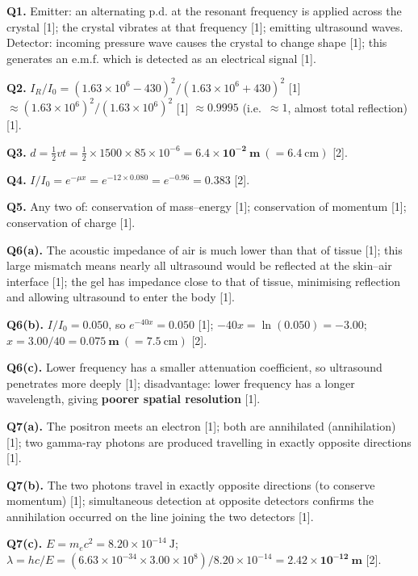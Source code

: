 \begin{markscheme}

\textbf{Q1.} Emitter: an alternating p.d. at the resonant frequency is applied across the crystal [1]; the crystal vibrates at that frequency [1]; emitting ultrasound waves. Detector: incoming pressure wave causes the crystal to change shape [1]; this generates an e.m.f. which is detected as an electrical signal [1].

\vspace{0.5em}\textbf{Q2.} $I_R/I_0 = (1.63\times10^6 - 430)^2/(1.63\times10^6 + 430)^2$ [1] $\approx (1.63\times10^6)^2/(1.63\times10^6)^2$ [1] $\approx 0.9995$ (i.e.\ $\approx 1$, almost total reflection) [1].

\vspace{0.5em}\textbf{Q3.} $d = \tfrac{1}{2}vt = \tfrac{1}{2} \times 1500 \times 85\times10^{-6} = \mathbf{6.4\times10^{-2}\ \text{m}}\ (= 6.4\ \text{cm})$ [2].

\vspace{0.5em}\textbf{Q4.} $I/I_0 = e^{-\mu x} = e^{-12\times0.080} = e^{-0.96} = \mathbf{0.383}$ [2].

\vspace{0.5em}\textbf{Q5.} Any two of: conservation of mass--energy [1]; conservation of momentum [1]; conservation of charge [1].

\vspace{0.5em}\textbf{Q6(a).} The acoustic impedance of air is much lower than that of tissue [1]; this large mismatch means nearly all ultrasound would be reflected at the skin--air interface [1]; the gel has impedance close to that of tissue, minimising reflection and allowing ultrasound to enter the body [1].

\vspace{0.5em}\textbf{Q6(b).} $I/I_0 = 0.050$, so $e^{-40x} = 0.050$ [1]; $-40x = \ln(0.050) = -3.00$; $x = 3.00/40 = \mathbf{0.075\ \text{m}}\ (= 7.5\ \text{cm})$ [2].

\vspace{0.5em}\textbf{Q6(c).} Lower frequency has a smaller attenuation coefficient, so ultrasound penetrates more deeply [1]; disadvantage: lower frequency has a longer wavelength, giving \textbf{poorer spatial resolution} [1].

\vspace{0.5em}\textbf{Q7(a).} The positron meets an electron [1]; both are annihilated (annihilation) [1]; two gamma-ray photons are produced travelling in exactly opposite directions [1].

\vspace{0.5em}\textbf{Q7(b).} The two photons travel in exactly opposite directions (to conserve momentum) [1]; simultaneous detection at opposite detectors confirms the annihilation occurred on the line joining the two detectors [1].

\vspace{0.5em}\textbf{Q7(c).} $E = m_e c^2 = 8.20\times10^{-14}\ \text{J}$; $\lambda = hc/E = (6.63\times10^{-34}\times3.00\times10^8)/8.20\times10^{-14} = \mathbf{2.42\times10^{-12}\ \text{m}}$ [2].

\end{markscheme}

